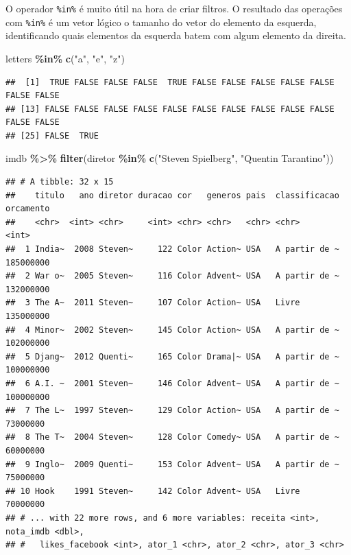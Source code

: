 \documentclass[
]{book}
\newenvironment{Shaded}{\begin{snugshade}}{\end{snugshade}}
\newcommand{\KeywordTok}[1]{\textcolor[rgb]{0.13,0.29,0.53}{\textbf{#1}}}
\newcommand{\NormalTok}[1]{#1}
\newcommand{\OperatorTok}[1]{\textcolor[rgb]{0.81,0.36,0.00}{\textbf{#1}}}
\newcommand{\StringTok}[1]{\textcolor[rgb]{0.31,0.60,0.02}{#1}}
\begin{document}
O operador \texttt{\%in\%} é muito útil na hora de criar filtros. O resultado das operações com \texttt{\%in\%} é um vetor lógico o tamanho do vetor do elemento da esquerda, identificando quais elementos da esquerda batem com algum elemento da direita.

\begin{Shaded}
\begin{Highlighting}[]
\NormalTok{letters }\OperatorTok{\%in\%}\StringTok{ }\KeywordTok{c}\NormalTok{(}\StringTok{"a"}\NormalTok{, }\StringTok{"e"}\NormalTok{, }\StringTok{"z"}\NormalTok{)}
\end{Highlighting}
\end{Shaded}

\begin{verbatim}
##  [1]  TRUE FALSE FALSE FALSE  TRUE FALSE FALSE FALSE FALSE FALSE FALSE FALSE
## [13] FALSE FALSE FALSE FALSE FALSE FALSE FALSE FALSE FALSE FALSE FALSE FALSE
## [25] FALSE  TRUE
\end{verbatim}

\begin{Shaded}
\begin{Highlighting}[]
\NormalTok{imdb }\OperatorTok{\%>\%}
\StringTok{  }\KeywordTok{filter}\NormalTok{(diretor }\OperatorTok{\%in\%}\StringTok{ }\KeywordTok{c}\NormalTok{(}\StringTok{"Steven Spielberg"}\NormalTok{, }\StringTok{"Quentin Tarantino"}\NormalTok{))}
\end{Highlighting}
\end{Shaded}

\begin{verbatim}
## # A tibble: 32 x 15
##    titulo   ano diretor duracao cor   generos pais  classificacao orcamento
##    <chr>  <int> <chr>     <int> <chr> <chr>   <chr> <chr>             <int>
##  1 India~  2008 Steven~     122 Color Action~ USA   A partir de ~ 185000000
##  2 War o~  2005 Steven~     116 Color Advent~ USA   A partir de ~ 132000000
##  3 The A~  2011 Steven~     107 Color Action~ USA   Livre         135000000
##  4 Minor~  2002 Steven~     145 Color Action~ USA   A partir de ~ 102000000
##  5 Djang~  2012 Quenti~     165 Color Drama|~ USA   A partir de ~ 100000000
##  6 A.I. ~  2001 Steven~     146 Color Advent~ USA   A partir de ~ 100000000
##  7 The L~  1997 Steven~     129 Color Action~ USA   A partir de ~  73000000
##  8 The T~  2004 Steven~     128 Color Comedy~ USA   A partir de ~  60000000
##  9 Inglo~  2009 Quenti~     153 Color Advent~ USA   A partir de ~  75000000
## 10 Hook    1991 Steven~     142 Color Advent~ USA   Livre          70000000
## # ... with 22 more rows, and 6 more variables: receita <int>, nota_imdb <dbl>,
## #   likes_facebook <int>, ator_1 <chr>, ator_2 <chr>, ator_3 <chr>
\end{verbatim}
\end{document}
